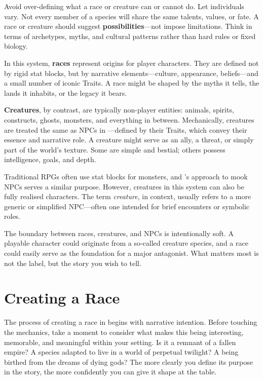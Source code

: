 Avoid over-defining what a race or creature can or cannot do. Let individuals vary. Not every member of a species will share the same talents, values, or fate. A race or creature should suggest \textbf{possibilities}—not impose limitations. Think in terms of archetypes, myths, and cultural patterns rather than hard rules or fixed biology.

In this system, \textbf{races} represent origins for player characters. They are defined not by rigid stat blocks, but by narrative elements—culture, appearance, beliefs—and a small number of iconic Traits. A race might be shaped by the myths it tells, the lands it inhabits, or the legacy it bears.

\textbf{Creatures}, by contrast, are typically non-player entities: animals, spirits, constructs, ghosts, monsters, and everything in between. Mechanically, creatures are treated the same as NPCs in \wyrd—defined by their Traits, which convey their essence and narrative role. A creature might serve as an ally, a threat, or simply part of the world’s texture. Some are simple and bestial; others possess intelligence, goals, and depth.

Traditional RPGs often use stat blocks for monsters, and \wyrd’s approach to mook NPCs serves a similar purpose. However, creatures in this system can also be fully realised characters. The term \emph{creature}, in context, usually refers to a more generic or simplified NPC—often one intended for brief encounters or symbolic roles.

The boundary between races, creatures, and NPCs is intentionally soft. A playable character could originate from a so-called creature species, and a race could easily serve as the foundation for a major antagonist. What matters most is not the label, but the story you wish to tell.



\section{Creating a Race}

The process of creating a race in \wyrd begins with narrative intention. Before touching the mechanics, take a moment to consider what makes this being interesting, memorable, and meaningful within your setting. Is it a remnant of a fallen empire? A species adapted to live in a world of perpetual twilight? A being birthed from the dreams of dying gods? The more clearly you define its purpose in the story, the more confidently you can give it shape at the table.


